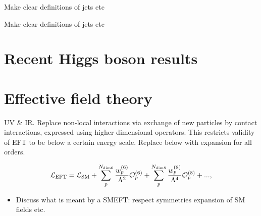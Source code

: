 \begin{table}[htb!]
    \caption[VH leptonic STXS stage 1.2 definitions and fractions]{Make clear definitions of jets etc}
    \label{tab:vh_definitions}
    \centering
    \scriptsize
    \renewcommand{\arraystretch}{1.2}
    \setlength{\tabcolsep}{5pt}
    \hspace*{-5cm}
    
    \hspace*{-5cm}
\end{table}

\begin{table}[htb!]
    \caption[Top-associated and bbH STXS stage 1.2 definitions and fractions]{Make clear definitions of jets etc}
    \label{tab:top_definitions}
    \centering
    \scriptsize
    \renewcommand{\arraystretch}{1.5}
    \setlength{\tabcolsep}{5pt}
    \hspace*{-5cm}
    
    \hspace*{-5cm}
\end{table}

\section{Recent Higgs boson results}

\section{Effective field theory}\label{sec:theory_eft}

UV & IR. Replace non-local interactions via exchange of new particles by contact interactions, expressed using higher dimensional operators. This restricts validity of EFT to be below a certain energy scale. Replace below with expansion for all orders.

\begin{equation}\label{eq:eft_expansion}
    \mathcal{L}_{\rm{EFT}} = \mathcal{L}_{\rm{SM}} + \sum^{N_{\rm{dim6}}}_p \frac{w^{(6)}_p}{\Lambda^2}\mathcal{O}^{(6)}_p + \sum^{N_{\rm{dim8}}}_p \frac{w^{(8)}_p}{\Lambda^4}\mathcal{O}^{(8)}_p + ... ,
\end{equation}

\begin{itemize}
    \item Discuss what is meant by a SMEFT: respect symmetries expansion of SM fields etc.
\end{itemize}

